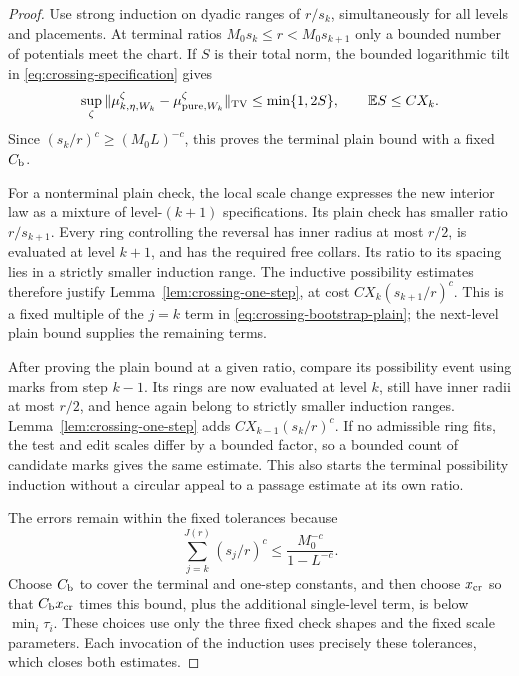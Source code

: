 \begin{proof}
Use strong induction on dyadic ranges of $r/s_k$, simultaneously for
all levels and placements.  At terminal ratios
$M_0s_k\leq r<M_0s_{k+1}$ only a bounded number of potentials meet the
chart.  If $S$ is their total norm, the bounded logarithmic tilt in
\eqref{eq:crossing-specification} gives
\[
 \sup_\zeta\|\mu_{k,\eta,W_k}^{\zeta}
                  -\mu_{{\rm pure},W_k}^{\zeta}\|_{\operatorname{TV}}
 \leq\min\{1,2S\},\qquad \mathbb E S\leq C X_k.
\]
Since $(s_k/r)^c\geq(M_0L)^{-c}$, this proves the terminal plain bound
with a fixed $C_{\rm b}$.

For a nonterminal plain check, the local scale change expresses the new
interior law as a mixture of level-$(k+1)$ specifications.  Its plain
check has smaller ratio $r/s_{k+1}$.  Every ring controlling the reversal
has inner radius at most $r/2$, is evaluated at level $k+1$, and has
the required free collars.  Its ratio to its spacing lies in a strictly
smaller induction range.  The inductive possibility estimates therefore
justify Lemma~\ref{lem:crossing-one-step}, at cost
$CX_k(s_{k+1}/r)^c$.  This is a fixed multiple of the $j=k$ term in
\eqref{eq:crossing-bootstrap-plain}; the next-level plain bound supplies
the remaining terms.

After proving the plain bound at a given ratio, compare its possibility
event using marks from step $k-1$.  Its rings are now evaluated at level
$k$, still have inner radii at most $r/2$, and hence again belong to
strictly smaller induction ranges.  Lemma~\ref{lem:crossing-one-step}
adds $CX_{k-1}(s_k/r)^c$.  If no admissible ring fits, the test and edit
scales differ by a bounded factor, so a bounded count of candidate marks
gives the same estimate.  This also starts the terminal possibility
induction without a circular appeal to a passage estimate at its own
ratio.

The errors remain within the fixed tolerances because
\begin{equation}
 \sum_{j=k}^{J(r)}(s_j/r)^c
 \leq\frac{M_0^{-c}}{1-L^{-c}}.
 \label{eq:crossing-geometric-sum}
\end{equation}
Choose $C_{\rm b}$ to cover the terminal and one-step constants, and
then choose $x_{\rm cr}$ so that $C_{\rm b}x_{\rm cr}$ times this bound,
plus the additional single-level term, is below $\min_i\tau_i$.
These choices use only the three fixed check shapes and the fixed scale
parameters.  Each invocation of the induction uses precisely these
tolerances, which closes both estimates.
\end{proof}

